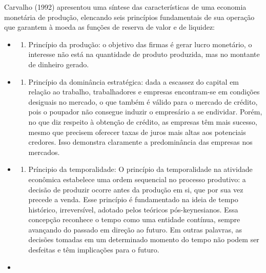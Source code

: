 \documentclass[a4paper,12pt]{article}
\providecommand{\tightlist}{%
  \setlength{\itemsep}{0pt}\setlength{\parskip}{0pt}}\usepackage{longtable,booktabs,array}
\begin{document}
Carvalho (1992) apresentou uma síntese das características de uma
economia monetária de produção, elencando seis princípios fundamentais
de sua operação que garantem à moeda as funções de reserva de valor e de
liquidez:

\begin{itemize}
\item
  \begin{enumerate}
  \def\labelenumi{(\roman{enumi})}
  \tightlist
  \item
    Princípio da produção: o objetivo das firmas é gerar lucro
    monetário, o interesse não está na quantidade de produto produzida,
    mas no montante de dinheiro gerado.
  \end{enumerate}
\item
  \begin{enumerate}
  \def\labelenumi{(\roman{enumi})}
  \setcounter{enumi}{1}
  \tightlist
  \item
    Princípio da dominância estratégica: dada a escassez do capital em
    relação ao trabalho, trabalhadores e empresas encontram-se em
    condições desiguais no mercado, o que também é válido para o mercado
    de crédito, pois o poupador não consegue induzir o empresário a se
    endividar. Porém, no que diz respeito à obtenção de crédito, as
    empresas têm mais sucesso, mesmo que precisem oferecer taxas de
    juros mais altas aos potenciais credores. Isso demonstra claramente
    a predominância das empresas nos mercados.
  \end{enumerate}
\item
  \begin{enumerate}
  \def\labelenumi{(\roman{enumi})}
  \setcounter{enumi}{2}
  \tightlist
  \item
    Príncipio da temporalidade: O princípio da temporalidade na
    atividade econômica estabelece uma ordem sequencial no processo
    produtivo: a decisão de produzir ocorre antes da produção em si, que
    por sua vez precede a venda. Esse princípio é fundamentado na ideia
    de tempo histórico, irreversível, adotado pelos teóricos
    pós-keynesianos. Essa concepção reconhece o tempo como uma entidade
    contínua, sempre avançando do passado em direção ao futuro. Em
    outras palavras, as decisões tomadas em um determinado momento do
    tempo não podem ser desfeitas e têm implicações para o futuro.
  \end{enumerate}
\item
  \begin{enumerate}
  \def\labelenumi{(\roman{enumi})}

\end{enumerate}
\end{itemize}
\end{document}
